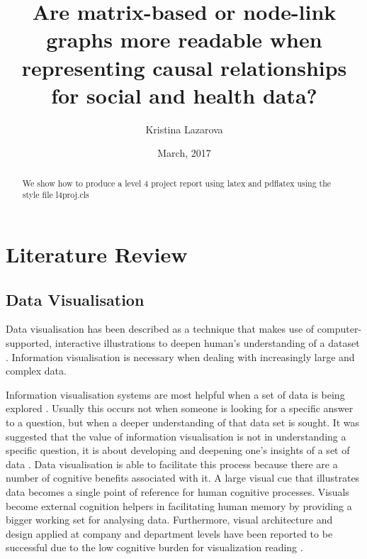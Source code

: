 \documentclass{l4proj}
\begin{document}
\title{Are matrix-based or node-link graphs more readable when representing causal relationships for social and health data?}
\author{Kristina Lazarova}
\date{March, 2017}
\maketitle

\begin{abstract}
We show how to produce a level 4 project report using latex and pdflatex using the 
style file l4proj.cls
\end{abstract}

\educationalconsent
%
%
\tableofcontents
\chapter{Literature Review}

\section{Data Visualisation}

Data visualisation has been described as a technique that makes use of computer-supported, interactive illustrations to deepen human's understanding of a dataset \cite{card1999readings}. Information visualisation is necessary when dealing with increasingly large and complex data.

Information visualisation systems are most helpful when a set of data is being explored \cite{fekete2008value}. Usually this occurs not when someone is looking for a specific answer to a question, but when a deeper understanding of that data set is sought. It was suggested that the value of information visualisation is not in understanding a specific question, it is about developing and deepening one's insights of a set of data \cite{fekete2008value}. Data visualisation is able to facilitate this process because there are a number of cognitive benefits associated with it. A large visual cue that illustrates data becomes a single point of reference for human cognitive processes. Visuals become external cognition helpers in facilitating human memory by providing a bigger working set for analysing data. Furthermore, visual architecture and design applied at company and department levels have been reported to be successful due to the low cognitive burden for visualization reading \cite{king2016cognitive}.
\end{document}
